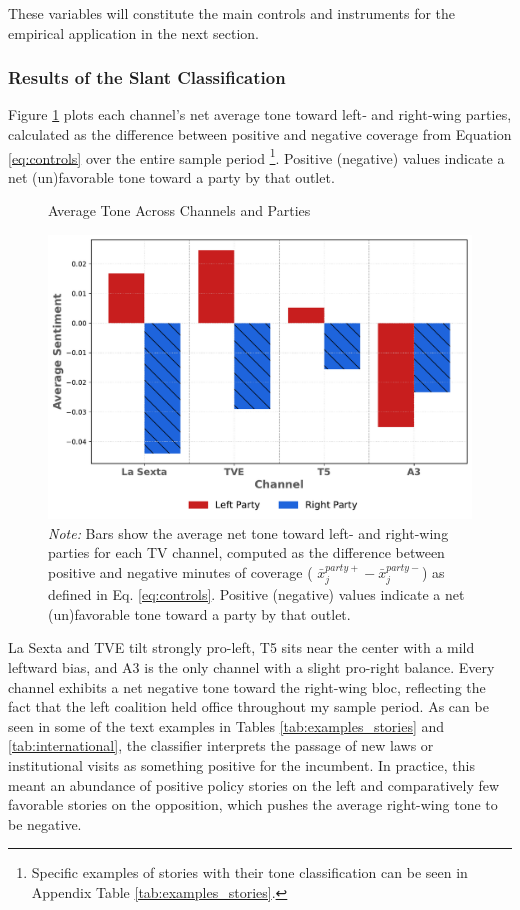 \documentclass[12pt]{article}
\begin{document}
	
	
		These variables will constitute the main controls and instruments for the empirical application in the next section. 
	

		\subsubsection*{Results of the Slant Classification}
	
	
	
	Figure \ref{fig:chat} plots each channel’s net average tone toward left‐ and right‐wing parties, calculated as the difference between positive and negative coverage from Equation \eqref{eq:controls} over the entire sample period \footnote{Specific examples of stories with their tone classification can be seen in Appendix Table \ref{tab:examples_stories}.}. Positive (negative) values indicate a net (un)favorable tone toward a party by that outlet. 
	
		\begin{figure}[!htbp]
		\caption{Average Tone Across Channels and Parties}
		\centering
		\includegraphics[width=120mm]{figures/chatgpt}
		\caption*{\small \textit{Note:} Bars show the average net tone toward left- and right-wing parties for each TV channel, computed as the difference between positive and negative minutes of coverage ( $	\bar{x}_j^{party+}-\bar{x}_j^{party-}$) as defined in Eq. \eqref{eq:controls}. Positive (negative) values indicate a net (un)favorable tone toward a party by that outlet.}
		\label{fig:chat}
	\end{figure}
	
	La Sexta and TVE tilt strongly pro-left, T5 sits near the center with a mild leftward bias, and A3 is the only channel  with a slight pro-right balance. Every channel exhibits a net negative tone toward the right-wing bloc, reflecting the fact that the left coalition held office throughout my sample period. As can be seen in some of the text examples in Tables \ref{tab:examples_stories} and \ref{tab:international}, the classifier interprets the passage of new laws or institutional visits as something positive for the incumbent. In practice, this meant an abundance of positive policy stories on the left and comparatively few favorable stories on the opposition, which pushes the average right-wing tone to be negative.
	
\end{document}
